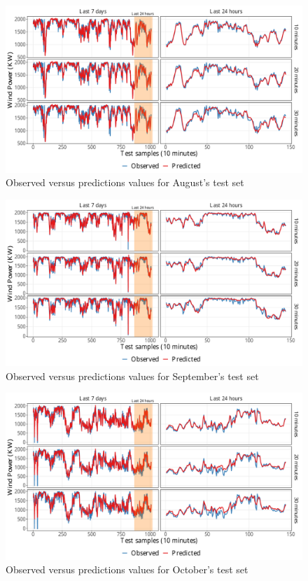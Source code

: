 \begin{figure}[htb!]
    \centering
    \includegraphics[width=\linewidth]{Media/cs2_PO_2017-08.pdf}
    \caption{Observed versus predictions values for August's test set}
    \label{fig:pred-Aug}
\end{figure}

\begin{figure}[htb!]
    \centering
    \includegraphics[width=\linewidth]{Media/cs2_PO_2017-09.pdf}
    \caption{Observed versus predictions values for September's test set}
    \label{fig:pred-Sep}
\end{figure}

\begin{figure}[htb!]
    \centering
    \includegraphics[width=\linewidth]{Media/cs2_PO_2017-10.pdf}
    \caption{Observed versus predictions values for October's test set}
    \label{fig:pred-Oct}
\end{figure}

